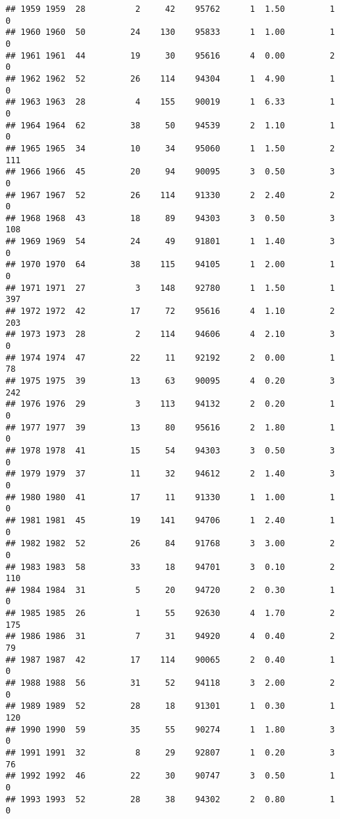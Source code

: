 \documentclass[
]{article}
\begin{document}
\begin{verbatim}
## 1959 1959  28          2     42    95762      1  1.50         1        0
## 1960 1960  50         24    130    95833      1  1.00         1        0
## 1961 1961  44         19     30    95616      4  0.00         2        0
## 1962 1962  52         26    114    94304      1  4.90         1        0
## 1963 1963  28          4    155    90019      1  6.33         1        0
## 1964 1964  62         38     50    94539      2  1.10         1        0
## 1965 1965  34         10     34    95060      1  1.50         2      111
## 1966 1966  45         20     94    90095      3  0.50         3        0
## 1967 1967  52         26    114    91330      2  2.40         2        0
## 1968 1968  43         18     89    94303      3  0.50         3      108
## 1969 1969  54         24     49    91801      1  1.40         3        0
## 1970 1970  64         38    115    94105      1  2.00         1        0
## 1971 1971  27          3    148    92780      1  1.50         1      397
## 1972 1972  42         17     72    95616      4  1.10         2      203
## 1973 1973  28          2    114    94606      4  2.10         3        0
## 1974 1974  47         22     11    92192      2  0.00         1       78
## 1975 1975  39         13     63    90095      4  0.20         3      242
## 1976 1976  29          3    113    94132      2  0.20         1        0
## 1977 1977  39         13     80    95616      2  1.80         1        0
## 1978 1978  41         15     54    94303      3  0.50         3        0
## 1979 1979  37         11     32    94612      2  1.40         3        0
## 1980 1980  41         17     11    91330      1  1.00         1        0
## 1981 1981  45         19    141    94706      1  2.40         1        0
## 1982 1982  52         26     84    91768      3  3.00         2        0
## 1983 1983  58         33     18    94701      3  0.10         2      110
## 1984 1984  31          5     20    94720      2  0.30         1        0
## 1985 1985  26          1     55    92630      4  1.70         2      175
## 1986 1986  31          7     31    94920      4  0.40         2       79
## 1987 1987  42         17    114    90065      2  0.40         1        0
## 1988 1988  56         31     52    94118      3  2.00         2        0
## 1989 1989  52         28     18    91301      1  0.30         1      120
## 1990 1990  59         35     55    90274      1  1.80         3        0
## 1991 1991  32          8     29    92807      1  0.20         3       76
## 1992 1992  46         22     30    90747      3  0.50         1        0
## 1993 1993  52         28     38    94302      2  0.80         1        0

\end{verbatim}
\end{document}
